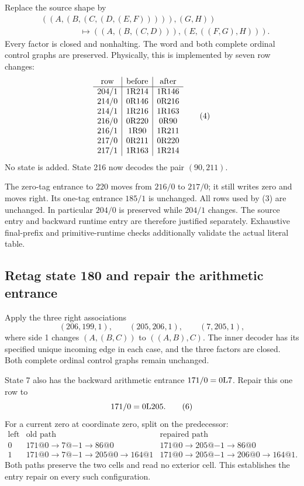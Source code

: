 Replace the source shape by
\begin{align*}
 &((A,(B,(C,(D,(E,F))))),(G,H))\\
 &\hspace{2cm}\longmapsto
 ((A,(B,(C,D))),(E,((F,G),H))).
\end{align*}
Every factor is closed and nonhalting. The word and both complete ordinal
control graphs are preserved. Physically, this is implemented by seven row
changes:
\[
\begin{array}{c|c|c}
\text{row}&\text{before}&\text{after}\\
\hline
204/1&1\mathrm{R}214&1\mathrm{R}146\\
214/0&0\mathrm{R}146&0\mathrm{R}216\\
214/1&1\mathrm{R}216&1\mathrm{R}163\\
216/0&0\mathrm{R}220&0\mathrm{R}90\\
216/1&1\mathrm{R}90&1\mathrm{R}211\\
217/0&0\mathrm{R}211&0\mathrm{R}220\\
217/1&1\mathrm{R}163&1\mathrm{R}214
\end{array}
\tag{4}
\]
No state is added. State 216 now decodes the pair \((90,211)\).

The zero-tag entrance to 220 moves from \(216/0\) to \(217/0\); it still
writes zero and moves right. Its one-tag entrance \(185/1\) is unchanged.
All rows used by (3) are unchanged. In particular \(204/0\) is preserved
while \(204/1\) changes. The source entry and backward runtime entry are
therefore justified separately. Exhaustive final-prefix and primitive-runtime
checks additionally validate the actual literal table.

\subsection{Retag state 180 and repair the arithmetic entrance}
Apply the three right associations
\[
 (206,199,1),\qquad(205,206,1),\qquad(7,205,1),
 \tag{5}
\]
where side 1 changes \((A,(B,C))\) to \(((A,B),C)\).
The inner decoder has its specified unique incoming edge in each case, and
the three factors are closed. Both complete ordinal control graphs remain
unchanged.

State 7 also has the backward arithmetic entrance \(171/0=0\mathrm{L}7\).
Repair this one row to
\[
                     171/0=0\mathrm{L}205.
 \tag{6}
\]
For a current zero at coordinate zero, split on the predecessor:
\[
\begin{array}{c|l|l}
\text{left bit}&\text{old path}&\text{repaired path}\\
\hline
0&171@0\to7@{-1}\to86@0&
 171@0\to205@{-1}\to86@0\\
1&171@0\to7@{-1}\to205@0\to164@1&
 171@0\to205@{-1}\to206@0\to164@1.
\end{array}
\tag{7}
\]
Both paths preserve the two cells and read no exterior cell. This establishes
the entry repair on every such configuration.

